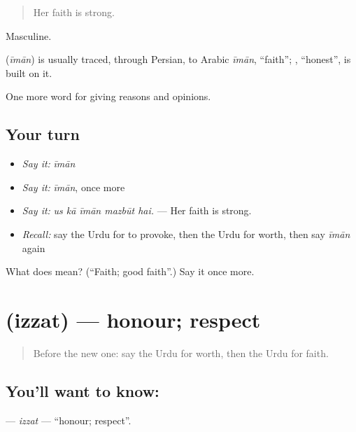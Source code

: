 \begin{quote}
Her faith is strong.
\end{quote}

Masculine.

\begin{cousinweb}
\textbf{} (\emph{īmān}) is usually traced, through Persian, to Arabic \emph{īmān}, \textquotedblleft{}faith\textquotedblright{}; \textbf{}, \textquotedblleft{}honest\textquotedblright{}, is built on it.
\end{cousinweb}

\begin{grammarlens}[title={What you've built}]
One more word for giving reasons and opinions.
\end{grammarlens}

\subsection*{Your turn}
\begin{itemize}
\raggedright
  \item \emph{Say it:} \emph{īmān}
  \item \emph{Say it:} \emph{īmān}, once more
  \item \emph{Say it:} \emph{us kā īmān mazbūt hai.} — Her faith is strong.
  \item \emph{Recall:} say the Urdu for to provoke, then the Urdu for worth, then say \emph{īmān} again
\end{itemize}

\begin{tcolorbox}[breakable,colback=teal!4,colframe=teal!35!black,title={Before you move on}]
What does  mean? (\textquotedblleft{}Faith; good faith\textquotedblright{}.) Say it once more.
\end{tcolorbox}
\section[\texorpdfstring{\ur{عزت} (izzat)}{عزت (izzat)}]{ (izzat) — honour; respect}

\label{lesson:UR-C345-izzat}



\begin{quote}
Before the new one: say the Urdu for worth, then the Urdu for faith.
\end{quote}

\subsection*{You'll want to know: }
\textbf{} — \emph{izzat} — \textquotedblleft{}honour; respect\textquotedblright{}.

